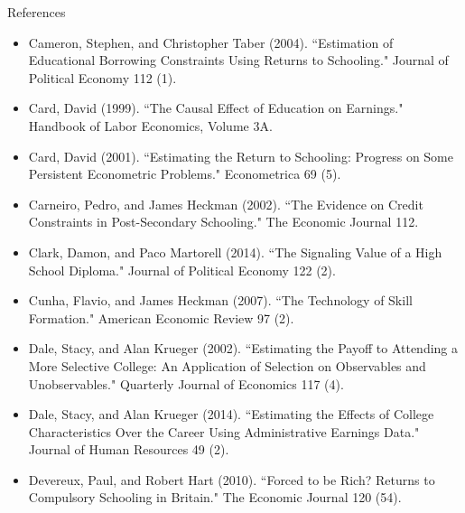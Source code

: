 \documentclass[blue]{beamer}
\begin{document}
{{{\begin{frame}{References}
\begin{scriptsize}
\begin{itemize}
\item Cameron, Stephen, and Christopher Taber (2004). ``Estimation of Educational Borrowing Constraints Using Returns to Schooling." Journal of Political Economy 112 (1). 
\item Card, David (1999). ``The Causal Effect of Education on Earnings." Handbook of Labor Economics, Volume 3A. 
\item Card, David (2001). ``Estimating the Return to Schooling: Progress on Some Persistent Econometric Problems." Econometrica 69 (5). 
\item Carneiro, Pedro, and James Heckman (2002). ``The Evidence on Credit Constraints in Post-Secondary Schooling." The Economic Journal 112.
\item Clark, Damon, and Paco Martorell (2014). ``The Signaling Value of a High School Diploma." Journal of Political Economy 122 (2).
\item Cunha, Flavio, and James Heckman (2007). ``The Technology of Skill Formation." American Economic Review 97 (2).
\item Dale, Stacy, and Alan Krueger (2002). ``Estimating the Payoff to Attending a More Selective College: An Application of Selection on Observables and Unobservables." Quarterly Journal of Economics 117 (4).
\item Dale, Stacy, and Alan Krueger (2014). ``Estimating the Effects of College Characteristics Over the Career Using Administrative Earnings Data." Journal of Human Resources 49 (2).
\item Devereux, Paul, and Robert Hart (2010). ``Forced to be Rich? Returns to Compulsory Schooling in Britain." The Economic Journal 120 (54). 
\end{itemize}
\end{scriptsize}
\end{frame}

}}}
\end{document}

